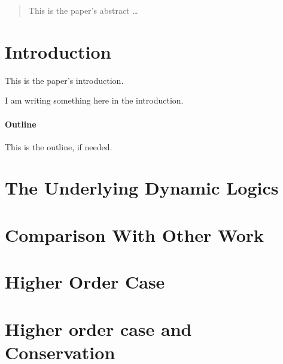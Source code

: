 \documentclass[a4paper,12pt]{article}
\begin{document}
\maketitle

\begin{abstract}
This is the paper's abstract \ldots
\end{abstract}

\section{Introduction}
This is the paper's introduction.

I am writing something here in the introduction.

\paragraph{Outline}
This is the outline, if needed.

\section{The Underlying Dynamic Logics}


\section{Comparison With Other Work}

\section{Higher Order Case}


\section{Higher order case and Conservation}




\end{document}
